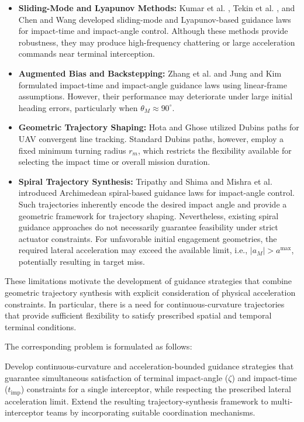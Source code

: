 \begin{itemize}
    \item \textbf{Sliding-Mode and Lyapunov Methods:}
    Kumar et al. \cite{kumar2012sliding}, Tekin et al. \cite{Tekin2016_IT}, and Chen and Wang \cite{Chen2018JGCD} developed sliding-mode and Lyapunov-based guidance laws for impact-time and impact-angle control. Although these methods provide robustness, they may produce high-frequency chattering or large acceleration commands near terminal interception.

    \item \textbf{Augmented Bias and Backstepping:}
    Zhang et al. \cite{zhang2013terminal, Zhang2015} and Jung and Kim \cite{Jung2006} formulated impact-time and impact-angle guidance laws using linear-frame assumptions. However, their performance may deteriorate under large initial heading errors, particularly when $\theta_M\approx 90^\circ$.

    \item \textbf{Geometric Trajectory Shaping:}
    Hota and Ghose \cite{hota2009modified} utilized Dubins paths for UAV convergent line tracking. Standard Dubins paths, however, employ a fixed minimum turning radius $r_m$, which restricts the flexibility available for selecting the impact time or overall mission duration.

    \item \textbf{Spiral Trajectory Synthesis:}
    Tripathy and Shima \cite{tripathy2019archimedean} and Mishra et al. \cite{mishra2024spiral} introduced Archimedean spiral-based guidance laws for impact-angle control. Such trajectories inherently encode the desired impact angle and provide a geometric framework for trajectory shaping. Nevertheless, existing spiral guidance approaches do not necessarily guarantee feasibility under strict actuator constraints. For unfavorable initial engagement geometries, the required lateral acceleration may exceed the available limit, i.e., $|a_M|>a^{\max}$, potentially resulting in target miss.
\end{itemize}

These limitations motivate the development of guidance strategies that combine geometric trajectory synthesis with explicit consideration of physical acceleration constraints. In particular, there is a need for continuous-curvature trajectories that provide sufficient flexibility to satisfy prescribed spatial and temporal terminal conditions.

The corresponding problem is formulated as follows:
\begin{problem}
Develop continuous-curvature and acceleration-bounded guidance strategies that guarantee simultaneous satisfaction of terminal impact-angle ($\zeta$) and impact-time ($t_{\mathrm{imp}}$) constraints for a single interceptor, while respecting the prescribed lateral acceleration limit. Extend the resulting trajectory-synthesis framework to multi-interceptor teams by incorporating suitable coordination mechanisms.
\end{problem}

